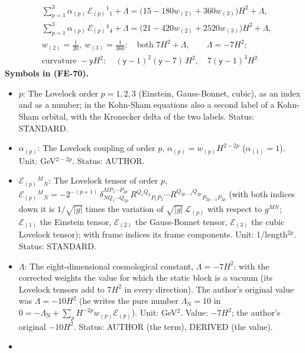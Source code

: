 \documentclass[
  10pt,
]{article}
\providecommand{\tightlist}{%
  \setlength{\itemsep}{0pt}\setlength{\parskip}{0pt}}
\begin{document}
\[
\begin{aligned}
&\sum_{p=1}^{3}\alpha_{(p)}\,\mathcal{E}_{(p)}{}^1{}_1 + \Lambda = \big(15 - 180w_{(2)} + 360w_{(3)}\big)H^2 + \Lambda,\\
&\sum_{p=1}^{3}\alpha_{(p)}\,\mathcal{E}_{(p)}{}^4{}_4 + \Lambda = \big(21 - 420w_{(2)} + 2520w_{(3)}\big)H^2 + \Lambda,\\
&w_{(2)} = \frac{1}{20},\ w_{(3)} = \frac{1}{360}:\quad \text{both } 7H^2 + \Lambda,\qquad \Lambda = -7H^2;\\
&\text{curvature } -\mathsf{y}H^2:\quad (\mathsf{y} - 1)^2(\mathsf{y} - 7)\,H^2,\quad 7(\mathsf{y} - 1)^3H^2
\end{aligned} \tag{FE-70}
\] \textbf{Symbols in (FE-70).}

\begin{itemize}
\tightlist
\item
  \(p\): The Lovelock order \(p = 1, 2, 3\) (Einstein, Gauss-Bonnet,
  cubic), as an index and as a number; in the Kohn-Sham equations also a
  second label of a Kohn-Sham orbital, with the Kronecker delta of the
  two labels. Status: STANDARD.
\item
  \(\alpha_{(p)}\): The Lovelock coupling of order \(p\),
  \(\alpha_{(p)} = w_{(p)}H^{2-2p}\) (\(\alpha_{(1)} = 1\)). Unit:
  GeV\(^{2-2p}\). Status: AUTHOR.
\item
  \(\mathcal{E}_{(p)}{}^M{}_N\): The Lovelock tensor of order \(p\),
  \(\mathcal{E}_{(p)}{}^M{}_N = -2^{-(p+1)}\,\delta^{MP_1\cdots P_{2p}}_{NQ_1\cdots Q_{2p}}\,R^{Q_1Q_2}{}_{P_1P_2}\cdots R^{Q_{2p-1}Q_{2p}}{}_{P_{2p-1}P_{2p}}\)
  (with both indices down it is \(1/\sqrt{\lvert g\rvert}\) times the
  variation of \(\sqrt{\lvert g\rvert}\,\mathcal{L}_{(p)}\) with respect
  to \(g^{MN}\); \(\mathcal{E}_{(1)}\) the Einstein tensor,
  \(\mathcal{E}_{(2)}\) the Gauss-Bonnet tensor, \(\mathcal{E}_{(3)}\)
  the cubic Lovelock tensor); with frame indices its frame components.
  Unit: 1/length\(^{2p}\). Status: STANDARD.
\item
  \(\Lambda\): The eight-dimensional cosmological constant,
  \(\Lambda = -7H^2\): with the corrected weights the value for which
  the static block is a vacuum (its Lovelock tensors add to \(7H^2\) in
  every direction). The author's original value was \(\Lambda = -10H^2\)
  (he writes the pure number \(\Lambda_{\mathrm{N}} = 10\) in
  \(0 = -\Lambda_{\mathrm{N}} + \sum_p H^{-2p}w_{(p)}\mathcal{E}_{(p)}\)).
  Unit: GeV\(^2\). Value: \(-7H^2\); the author's original \(-10H^2\).
  Status: AUTHOR (the term), DERIVED (the value).
\item

\end{itemize}
\end{document}
